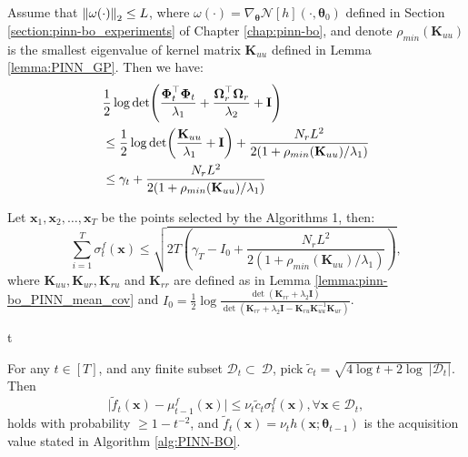 \begin{auxlemma}
\label{lemma:pinn-bo_IG_with_pde_upper_bound}
    Assume that $\norm{\omega(\cdot)}_2 \le L$, where $\omega(\cdot)  = \nabla_{\boldsymbol{\theta}} \mathcal{N}[h] (\cdot, \boldsymbol{\theta}_0)$ defined in Section \ref{section:pinn-bo_experiments} of Chapter \ref{chap:pinn-bo}, and denote $\rho_{min}(\mathbf{K}_{uu})$ is the smallest eigenvalue of kernel matrix $\mathbf{K}_{uu}$ defined in Lemma \ref{lemma:PINN_GP}. Then we have:
\begin{align*}
    & \frac{1}{2}\log \det(\frac{\boldsymbol{\Phi}_t^\top \boldsymbol{\Phi}_t}{\lambda_1} + \frac{\boldsymbol{\Omega}_r^\top \boldsymbol{\Omega}_r}{\lambda_2} + \mathbf{I})
    \notag \\
    & \le  \frac{1}{2}\log\det (\frac{\mathbf{K}_{uu}}{\lambda_1} +\mathbf{I})+\frac{N_r L^2}{2(1+ \rho_{min}(\mathbf{K}_{uu})/\lambda_1)}
    \\
    & \le \gamma_t +  \frac{N_r  L^2}{2(1+ \rho_{min}(\mathbf{K}_{uu})/\lambda_1)}
\end{align*}
\end{auxlemma}

\begin{auxlemma}
\label{lemma:pinn-bo_var_sum_bound}
    Let $\mathbf{x}_1, \mathbf{x}_2,\dots, \mathbf{x}_T$ be the points selected by the Algorithms 1, then:
    \[\sum_{i=1}^T \sigma_t^f(\mathbf{x}) \le \sqrt{2T \left(\gamma_T - I_0 + \frac{N_r L^2}{2(1+ \rho_{min}(\mathbf{K}_{uu})/\lambda_1)}\right)}, \]
    where $\mathbf{K}_{uu}, \mathbf{K}_{ur}, \mathbf{K}_{ru}$ and $\mathbf{K}_{rr}$ are defined as in Lemma \ref{lemma:pinn-bo_PINN_mean_cov} and $I_0 =\frac{1}{2}\log \frac{\det(\mathbf{K}_{rr} + \lambda_2\mathbf{I})}{\det(\mathbf{K}_{rr} + \lambda_2\mathbf{I} - \mathbf{K}_{ru} \mathbf{K}_{uu}^{-1} \mathbf{K}_{ur})}$.
\end{auxlemma}
t
\begin{auxlemma}
\label{lemma:pinn-bo_sampling_bound}
For any $t \in [T]$, and any finite subset $\mathcal{D}_t \subset\ \mathcal{D}$,  pick $\widetilde{c}_t =  \sqrt{4\log t + 2 \log \ \lvert \mathcal D_t \rvert}$. Then  
\[\lvert \widetilde{f}_t(\mathbf{x}) - \mu_{t-1}^f(\mathbf{x}) \rvert \leq \nu_t \widetilde{c}_t \sigma_t^f(\mathbf{x}), \forall \mathbf{x} \in \mathcal{D}_t, \] 
holds with probability $\geq  1-t^{-2}$, and $\widetilde{f}_t(\mathbf{x}) = \nu_t h(\mathbf{x}; \boldsymbol{\theta}_{t-1})$ is the acquisition value stated in Algorithm \ref{alg:PINN-BO}.   
\end{auxlemma}

